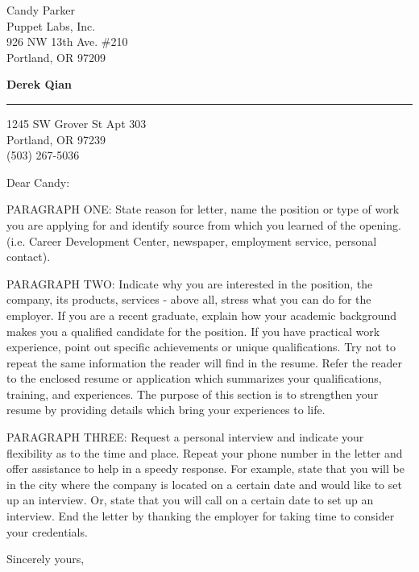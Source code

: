\documentclass{letter} %
\begin{document}
\signature{Derek Qian}           %
\longindentation=0pt                       %
\let\raggedleft\raggedright                %
 
 
\begin{letter}{Candy Parker \\
Puppet Labs, Inc. \\
926 NW 13th Ave. \#210 \\
Portland, OR 97209}


\begin{flushleft}
{\large\bf Derek Qian}
\end{flushleft}
\medskip\hrule height 1pt
\begin{flushright}
\hfill 1245 SW Grover St Apt 303 \\
\hfill Portland, OR 97239 \\
\hfill (503) 267-5036
\end{flushright} 
\vfill %

 
\opening{Dear Candy:} 
 
\noindent PARAGRAPH ONE: State reason for letter, name the position or type 
of work you are applying for and identify source from  which  you 
learned   of   the  opening.  (i.e.  Career  Development  Center, 
newspaper, employment service, personal contact). 
 
\noindent PARAGRAPH  TWO:  Indicate why you are interested in the position, 
the company, its products, services - above all, stress what  you 
can  do  for  the employer. If you are a recent graduate, explain 
how your academic background makes you a qualified candidate  for 
the  position.  If  you have practical work experience, point out 
specific achievements or unique qualifications. Try not to repeat 
the  same  information  the reader will find in the resume. Refer 
the reader to the enclosed resume or application which summarizes 
your  qualifications,  training,  and experiences. The purpose of 
this section is to strengthen your resume  by  providing  details 
which bring your experiences to life. 
 
\noindent PARAGRAPH THREE: Request a personal interview and  indicate  your 
flexibility as to the time and place. Repeat your phone number in 
the letter and offer assistance to help in a speedy response. For 
example,  state that you will be in the city where the company is 
located on a certain date and would like to set up an  interview. 
Or,  state  that  you  will  call  on a certain date to set up an 
interview. End the letter by thanking  the  employer  for  taking 
time to consider your credentials. 
 
\closing{Sincerely yours,} 
 

 
\encl{}  				%

\end{letter}
 
\end{document}

